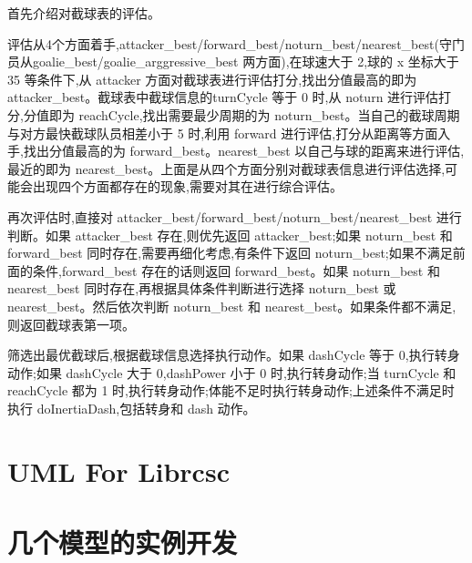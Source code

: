 首先介绍对截球表的评估。

评估从4个方面着手,attacker_best/forward_best/noturn_best/nearest_best(守门员从goalie_best/goalie_arggressive_best 两方面),在球速大于 2,球的 x 坐标大于 35 等条件下,从 attacker 方面对截球表进行评估打分,找出分值最高的即为 attacker_best。截球表中截球信息的turnCycle 等于 0 时,从 noturn 进行评估打分,分值即为 reachCycle,找出需要最少周期的为 noturn_best。当自己的截球周期与对方最快截球队员相差小于 5 时,利用 forward 进行评估,打分从距离等方面入手,找出分值最高的为 forward_best。nearest_best 以自己与球的距离来进行评估,最近的即为 nearest_best。上面是从四个方面分别对截球表信息进行评估选择,可能会出现四个方面都存在的现象,需要对其在进行综合评估。


再次评估时,直接对 attacker_best/forward_best/noturn_best/nearest_best 进行判断。如果 attacker_best 存在,则优先返回 attacker_best;如果 noturn_best 和 forward_best 同时存在,需要再细化考虑,有条件下返回 noturn_best;如果不满足前面的条件,forward_best 存在的话则返回 forward_best。如果 noturn_best 和 nearest_best 同时存在,再根据具体条件判断进行选择 noturn_best 或 nearest_best。然后依次判断 noturn_best 和 nearest_best。如果条件都不满足,则返回截球表第一项。

筛选出最优截球后,根据截球信息选择执行动作。如果 dashCycle 等于 0,执行转身动作;如果 dashCycle 大于 0,dashPower 小于 0 时,执行转身动作;当 turnCycle 和 reachCycle 都为 1 时,执行转身动作;体能不足时执行转身动作;上述条件不满足时执行 doInertiaDash,包括转身和 dash 动作。
\section{UML For Librcsc}

\section{几个模型的实例开发}



